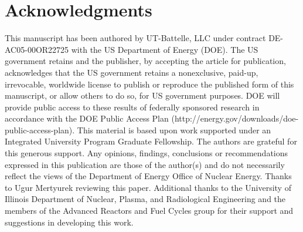 \documentclass{style/nseJournal}
\begin{document}
\section*{Acknowledgments}
This manuscript has been authored by UT-Battelle, LLC under contract DE-AC05-00OR22725 with the US Department of Energy (DOE). The US government retains and the publisher, by accepting the article for publication, acknowledges that the US government retains a nonexclusive, paid-up, irrevocable, worldwide license to publish or reproduce the published form of this manuscript, or allow others to do so, for US government purposes. DOE will provide public access to these results of federally sponsored research in accordance with the DOE Public Access Plan (http://energy.gov/downloads/doe-public-access-plan).
This material is based upon work supported under an Integrated University Program Graduate Fellowship.
The authors are grateful for this generous support.
Any opinions, findings, conclusions or recommendations expressed in this publication are
those of the author(s) and do not necessarily reflect the views of the Department of Energy
Office of Nuclear Energy.
Thanks to Ugur Mertyurek reviewing this paper.
Additional thanks to the University of Illinois Department of Nuclear, Plasma, and Radiological Engineering and the members of the Advanced Reactors and Fuel Cycles group for their support and suggestions in developing this work.



\pagebreak

\end{document}
